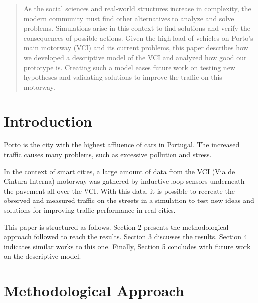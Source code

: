 \documentclass[conference]{IEEEtran}
\begin{document}




\maketitle

\begin{abstract}
As the social sciences and real-world structures increase in complexity, the modern community must find other alternatives to analyze and solve problems. Simulations arise in this context to find solutions and verify the consequences of possible actions. 
Given the high load of vehicles on Porto's main motorway (VCI) and its current problems, this paper describes how we developed a descriptive model of the VCI and analyzed how good our prototype is. 
Creating such a model eases future work on testing new hypotheses and validating solutions to improve the traffic on this motorway. 
\end{abstract}

\IEEEpeerreviewmaketitle


\section{Introduction}
Porto is the city with the highest affluence of cars in Portugal. The increased traffic causes many problems, such as excessive pollution and stress. %

In the context of smart cities, a large amount of data from the VCI (Via de Cintura Interna) motorway was gathered by inductive-loop sensors underneath the pavement all over the VCI. 
With this data, it is possible to recreate the observed and measured traffic on the streets in a simulation to test new ideas and solutions for improving traffic performance in real cities. %

This paper is structured as follows. Section 2 presents the methodological approach followed to reach the results. Section 3 discusses the results. Section 4 indicates similar works to this one. Finally, Section 5 concludes with future work on the descriptive model. %

\section{Methodological Approach}
\end{document}

